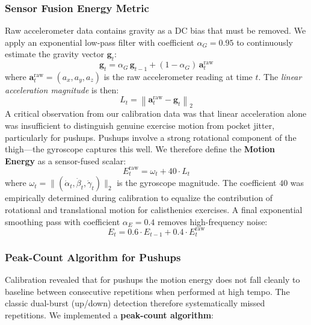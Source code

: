 \documentclass[11pt]{article}
\begin{document}
\subsubsection{Sensor Fusion Energy Metric}

Raw accelerometer data contains gravity as a DC bias that must be removed. We apply an exponential low-pass filter with coefficient $\alpha_G = 0.95$ to continuously estimate the gravity vector $\mathbf{g}_t$:
\begin{equation}
  \mathbf{g}_t = \alpha_G \, \mathbf{g}_{t-1} + (1 - \alpha_G) \, \mathbf{a}_t^{\text{raw}}
  \label{eq:gravity_filter}
\end{equation}
where $\mathbf{a}_t^{\text{raw}} = (a_x, a_y, a_z)$ is the raw accelerometer reading at time $t$. The \textit{linear acceleration magnitude} is then:
\begin{equation}
  L_t = \left\| \mathbf{a}_t^{\text{raw}} - \mathbf{g}_t \right\|_2
  \label{eq:linear_acc}
\end{equation}
A critical observation from our calibration data was that linear acceleration alone was insufficient to distinguish genuine exercise motion from pocket jitter, particularly for pushups. Pushups involve a strong rotational component of the thigh—the gyroscope captures this well. We therefore define the \textbf{Motion Energy} as a sensor-fused scalar:
\begin{equation}
  E_t^{\text{raw}} = \omega_t + 40 \cdot L_t
  \label{eq:raw_energy}
\end{equation}
where $\omega_t = \|(\dot\alpha_t, \dot\beta_t, \dot\gamma_t)\|_2$ is the gyroscope magnitude. The coefficient $40$ was empirically determined during calibration to equalize the contribution of rotational and translational motion for calisthenics exercises. A final exponential smoothing pass with coefficient $\alpha_E = 0.4$ removes high-frequency noise:
\begin{equation}
  E_t = 0.6 \cdot E_{t-1} + 0.4 \cdot E_t^{\text{raw}}
  \label{eq:smoothed_energy}
\end{equation}

\subsubsection{Peak-Count Algorithm for Pushups}

Calibration revealed that for pushups the motion energy does not fall cleanly to baseline between consecutive repetitions when performed at high tempo. The classic dual-burst (up/down) detection therefore systematically missed repetitions. We implemented a \textbf{peak-count algorithm}:
\end{document}
